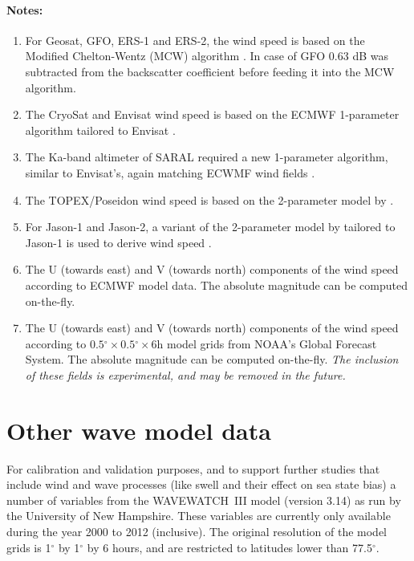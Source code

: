 \documentclass[a4paper,11pt,openany,natbib,nomargin]{thesis}
\renewcommand\deg{\ensuremath{^\circ}}
\newenvironment{notes}[1][Notes:]{\FloatBarrier\paragraph{#1}\begin{enumerate}}{\end{enumerate}}
\begin{document}
\begin{notes}
\item For Geosat, GFO, ERS-1 and ERS-2, the wind speed is based on the Modified Chelton-Wentz (MCW) algorithm \citep{witter1991}. In case of GFO 0.63 dB was subtracted from the backscatter coefficient before feeding it into the MCW algorithm.\label{item:wind_speed_mcw}
\item The CryoSat and Envisat wind speed is based on the ECMWF 1-parameter algorithm tailored to Envisat \citep{abdalla2007}.\label{item:wind_speed_abdalla}
\item The Ka-band altimeter of SARAL required a new 1-parameter algorithm, similar to Envisat's, again matching ECWMF wind fields \citep{lillibridge2014}.\label{item:wind_speed_saral}
\item The TOPEX/Poseidon wind speed is based on the 2-parameter model by \citet{gourrion2002}.\label{item:wind_speed_topex}
\item For Jason-1 and Jason-2, a variant of the 2-parameter model by \citet{gourrion2002} tailored to Jason-1 is used to derive wind speed \citep{collard2005}.\label{item:wind_speed_jason}
\item The U (towards east) and V (towards north) components of the wind speed according to ECMWF model data. The absolute magnitude can be computed on-the-fly.\label{item:wind_speed_ecmwf}
\item The U (towards east) and V (towards north) components of the wind speed according to $0.5\deg\times0.5\deg\times6$h model grids from NOAA's Global Forecast System. The absolute magnitude can be computed on-the-fly. \emph{The inclusion of these fields is experimental, and may be removed in the future.}\label{item:wind_speed_gfs}
\end{notes}

\section{Other wave model data}
\label{var:wave}
For calibration and validation purposes, and to support further studies that include wind and wave processes (like swell and their effect on sea state bias) a number of variables from the WAVEWATCH~III model (version 3.14) \citep{tolman2009} as run by the University of New Hampshire. These variables are currently only available during the year 2000 to 2012 (inclusive). The original resolution of the model grids is 1$\deg$ by 1$\deg$ by 6 hours, and are restricted to latitudes lower than 77.5$\deg$.
\end{document}
